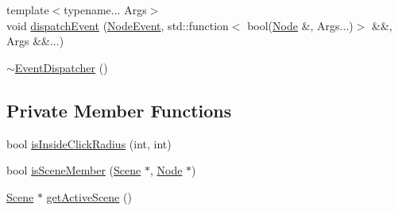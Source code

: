 \begin{DoxyCompactItemize}
\item 
{\footnotesize template$<$typename... Args$>$ }\\void \mbox{\hyperlink{classsage_1_1EventDispatcher_a80201aec738c2f1aaa5b812f867f28fd}{dispatch\+Event}} (\mbox{\hyperlink{namespacesage_ad2c7b0e1ebf67f572d43620e6b07aa13}{Node\+Event}}, std\+::function$<$ bool(\mbox{\hyperlink{classsage_1_1Node}{Node}} \&, Args...)$>$ \&\&, Args \&\&...)
\item 
\mbox{\hyperlink{classsage_1_1EventDispatcher_abb5f401014e87f03027d6c4450964e55}{$\sim$\+Event\+Dispatcher}} ()
\end{DoxyCompactItemize}
\subsection*{Private Member Functions}
\begin{DoxyCompactItemize}
\item 
bool \mbox{\hyperlink{classsage_1_1EventDispatcher_a918e15fc278d82e1826c5da31b6cc897}{is\+Inside\+Click\+Radius}} (int, int)
\item 
bool \mbox{\hyperlink{classsage_1_1EventDispatcher_ae76233a36c5bea9afdee715231c30641}{is\+Scene\+Member}} (\mbox{\hyperlink{classsage_1_1Scene}{Scene}} $\ast$, \mbox{\hyperlink{classsage_1_1Node}{Node}} $\ast$)
\item 
\mbox{\hyperlink{classsage_1_1Scene}{Scene}} $\ast$ \mbox{\hyperlink{classsage_1_1EventDispatcher_a360b6c05663a1716b7caad26dbc89279}{get\+Active\+Scene}} ()
\end{DoxyCompactItemize}
